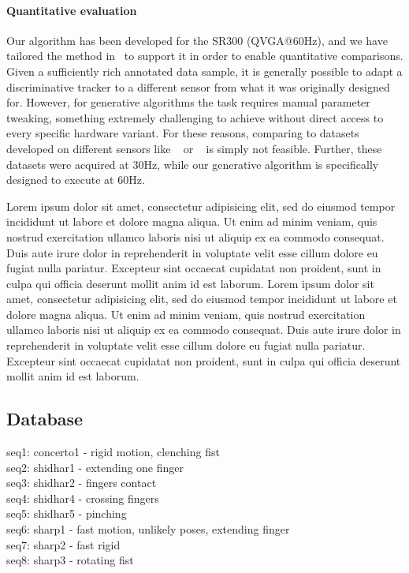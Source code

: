 \paragraph{Quantitative evaluation}
Our algorithm has been developed for the \realsense{} SR300 (QVGA@60Hz), and we have tailored the method in~\cite{tagliasacchi2015robust} to support it in order to enable quantitative comparisons.
% 
Given a sufficiently rich annotated data sample, it is generally possible to adapt a discriminative tracker to a different sensor from what it was originally designed for. However, for generative algorithms the task requires manual parameter tweaking, something extremely challenging to achieve without direct access to every specific hardware variant.
% 
For these reasons, comparing to datasets developed on different sensors like \dexter{}~\cite{sridhar2013multicam} or \fingerpaint{}~\cite{sharp2015accurate} is simply not feasible. Further, these datasets were acquired at 30Hz, while our generative algorithm is specifically designed to execute at 60Hz.



\begin{DRAFT}
Lorem ipsum dolor sit amet, consectetur adipisicing elit, sed do eiusmod tempor incididunt ut labore et dolore magna aliqua. Ut enim ad minim veniam, quis nostrud exercitation ullamco laboris nisi ut aliquip ex ea commodo consequat. Duis aute irure dolor in reprehenderit in voluptate velit esse cillum dolore eu fugiat nulla pariatur. Excepteur sint occaecat cupidatat non proident, sunt in culpa qui officia deserunt mollit anim id est laborum. Lorem ipsum dolor sit amet, consectetur adipisicing elit, sed do eiusmod tempor incididunt ut labore et dolore magna aliqua. Ut enim ad minim veniam, quis nostrud exercitation ullamco laboris nisi ut aliquip ex ea commodo consequat. Duis aute irure dolor in reprehenderit in voluptate velit esse cillum dolore eu fugiat nulla pariatur. Excepteur sint occaecat cupidatat non proident, sunt in culpa qui officia deserunt mollit anim id est laborum.
\end{DRAFT}

\subsection{Database}
seq1: concerto1 - rigid motion, clenching fist \\
seq2: shidhar1 - extending one finger \\
seq3: shidhar2 - fingers contact \\
seq4: shidhar4 - crossing fingers \\ 
seq5: shidhar5 - pinching \\
seq6: sharp1 - fast motion, unlikely poses, extending finger \\ 
seq7: sharp2 - fast rigid  \\
seq8: sharp3 - rotating fist


